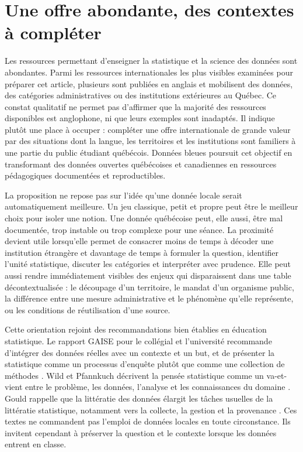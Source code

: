 \section{Une offre abondante, des contextes à compléter}

Les ressources permettant d'enseigner la statistique et la science des données sont abondantes. Parmi les ressources internationales les plus visibles examinées pour préparer cet article, plusieurs sont publiées en anglais et mobilisent des données, des catégories administratives ou des institutions extérieures au Québec. Ce constat qualitatif ne permet pas d'affirmer que la majorité des ressources disponibles est anglophone, ni que leurs exemples sont inadaptés. Il indique plutôt une place à occuper : compléter une offre internationale de grande valeur par des situations dont la langue, les territoires et les institutions sont familiers à une partie du public étudiant québécois. Données bleues poursuit cet objectif en transformant des données ouvertes québécoises et canadiennes en ressources pédagogiques documentées et reproductibles.

La proposition ne repose pas sur l'idée qu'une donnée locale serait automatiquement meilleure. Un jeu classique, petit et propre peut être le meilleur choix pour isoler une notion. Une donnée québécoise peut, elle aussi, être mal documentée, trop instable ou trop complexe pour une séance. La proximité devient utile lorsqu'elle permet de consacrer moins de temps à décoder une institution étrangère et davantage de temps à formuler la question, identifier l'unité statistique, discuter les catégories et interpréter avec prudence. Elle peut aussi rendre immédiatement visibles des enjeux qui disparaissent dans une table décontextualisée : le découpage d'un territoire, le mandat d'un organisme public, la différence entre une mesure administrative et le phénomène qu'elle représente, ou les conditions de réutilisation d'une source.

Cette orientation rejoint des recommandations bien établies en éducation statistique. Le rapport GAISE pour le collégial et l'université recommande d'intégrer des données réelles avec un contexte et un but, et de présenter la statistique comme un processus d'enquête plutôt que comme une collection de méthodes \cite{gaise}. Wild et Pfannkuch décrivent la pensée statistique comme un va-et-vient entre le problème, les données, l'analyse et les connaissances du domaine \cite{wild}. Gould rappelle que la littératie des données élargit les tâches usuelles de la littératie statistique, notamment vers la collecte, la gestion et la provenance \cite{gould}. Ces textes ne commandent pas l'emploi de données locales en toute circonstance. Ils invitent cependant à préserver la question et le contexte lorsque les données entrent en classe.

